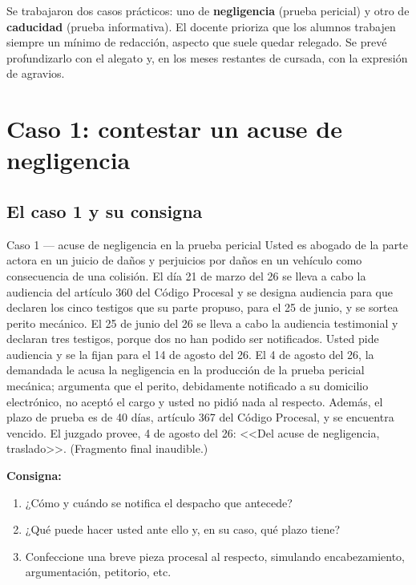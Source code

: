 \documentclass[12pt,oneside]{book}
\begin{document}
Se trabajaron dos casos prácticos: uno de \textbf{negligencia} (prueba pericial) y otro de \textbf{caducidad} (prueba informativa). El docente prioriza que los alumnos trabajen siempre un mínimo de redacción, aspecto que suele quedar relegado. Se prevé profundizarlo con el alegato y, en los meses restantes de cursada, con la expresión de agravios.

\chapter{Caso 1: contestar un acuse de negligencia}

\section{El caso 1 y su consigna}

\begin{exercise}{Caso 1 --- acuse de negligencia en la prueba pericial}
Usted es abogado de la parte actora en un juicio de daños y perjuicios por daños en un vehículo como consecuencia de una colisión. El día 21 de marzo del 26 se lleva a cabo la audiencia del artículo 360 del Código Procesal y se designa audiencia para que declaren los cinco testigos que su parte propuso, para el 25 de junio, y se sortea perito mecánico. El 25 de junio del 26 se lleva a cabo la audiencia testimonial y declaran tres testigos, porque dos no han podido ser notificados. Usted pide audiencia y se la fijan para el 14 de agosto del 26. El 4 de agosto del 26, la demandada le acusa la negligencia en la producción de la prueba pericial mecánica; argumenta que el perito, debidamente notificado a su domicilio electrónico, no aceptó el cargo y usted no pidió nada al respecto. Además, el plazo de prueba es de 40 días, artículo 367 del Código Procesal, y se encuentra vencido. El juzgado provee, 4 de agosto del 26: <<Del acuse de negligencia, traslado>>. (Fragmento final inaudible.)

\textbf{Consigna:}
\begin{enumerate}
    \item ¿Cómo y cuándo se notifica el despacho que antecede?
    \item ¿Qué puede hacer usted ante ello y, en su caso, qué plazo tiene?
    \item Confeccione una breve pieza procesal al respecto, simulando encabezamiento, argumentación, petitorio, etc.
\end{enumerate}
\end{exercise}
\end{document}
